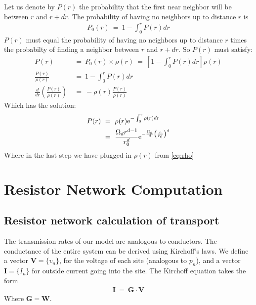 Let us denote by $P(r)$ the probability that the first near neighbor will be
between $r$ and $r+dr$. The probability of having no neighbors up to distance $r$ is
%
\begin{align}
P_0(r) \ =\  1 - \int_0^r P(r)dr
\end{align}
$P(r)$ must equal the probability of having no neighbors up to distance $r$ times
the probabilty of finding a neighbor between $r$ and $r+dr$. So $P(r)$ must satisfy:
%
\begin{align}
P(r) \ &=\ P_0(r) \times \rho(r) \ =\ \left[ 1-\int_0^r P(r)dr \right] \rho(r) \\
\frac{P(r)}{\rho(r)}\ &=\  1-\int_0^r P(r)dr \\
\frac{d}{dr}\left(\frac{P(r)}{\rho(r)}\right) \ &=\ -\rho(r)\frac{ P(r)}{\rho(r)}
\end{align}
%
Which has the solution:
%
\begin{align}
P(r) \ &=\ \rho(r) \mbox{e}^{-\int_0^r \rho(r) dr} \\
       &=\ \frac{\Omega_d r^{d-1}}{r_0^d} \mbox{e}^{-\frac{\Omega_d}{d} \left(\frac{r}{r_0}\right)^d}  \label{eq:spacing_dist}
\end{align}
%
Where in the last step we have plugged in $\rho(r)$ from \autoref{eq:rho}
%


%
%
%
%


\chapter{Resistor Network Computation}\label{sec:resnet}

\section{Resistor network calculation of transport}

The transmission rates of our model are analogous to
conductors. The conductance of the entire system can be derived
using Kirchoff's laws. 
We define a vector $\bm{V} = \{v_n\}$, for the voltage 
of each site (analogous to $p_n$), and a vector
$\bm{I} = \{I_n\}$ for outside current going into the site.
The Kirchoff equation takes the form
%
\begin{align}
\bm{I}\ =\ \bm{G}\cdot \bm{V}
\end{align}
%
Where $\bm{G} = \bm{W}$.


